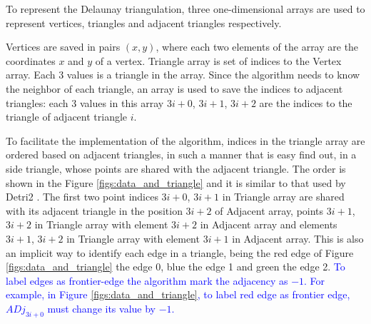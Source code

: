 \documentclass[pdflatex,sn-mathphys]{sn-jnl}%
\theoremstyle{thmstyleone}%
\theoremstyle{thmstyletwo}%
\theoremstyle{thmstylethree}%
\begin{document}


To represent the Delaunay triangulation, three one-dimensional arrays are used to represent  vertices, triangles and adjacent triangles respectively.

Vertices are saved in pairs $(x,y)$, where each two elements of the array are the coordinates $x$ and $y$ of a vertex. Triangle array is set of indices to the Vertex array. Each 3 values is a triangle in the array. Since the algorithm needs to know the neighbor of each triangle, an array is used to save the indices to adjacent triangles: each 3 values in this array $3i + 0$, $3i + 1$, $3i + 2$ are the indices to the triangle of adjacent triangle $i$. 

To facilitate the implementation of the algorithm, indices in the triangle array are ordered based on adjacent triangles, in such a manner that is easy find out, in a side triangle, whose points are shared with the adjacent triangle.  The order is shown in the Figure \ref{figs:data_and_triangle} and it is similar to that used by Detri2 \cite{Detri2}. The first two point indices $3i+0$, $3i+1$ in Triangle array are shared with its adjacent triangle in the position $3i+2$ of Adjacent array, points $3i+1$, $3i+2$ in Triangle array with element $3i+2$ in Adjacent array and elements $3i+1$, $3i+2$ in Triangle array with element $3i+1$ in Adjacent array. This is also an implicit way to identify each edge in a triangle, being the red edge of Figure \ref{figs:data_and_triangle} the edge 0, blue the edge 1 and green the edge 2.  \textcolor{blue}{To label edges as frontier-edge the algorithm mark the adjacency as $-1$. For example, in Figure \ref{figs:data_and_triangle}, to label red edge as frontier edge, $ADj_{3i+0}$ must change its value by $-1$. }
\end{document}
